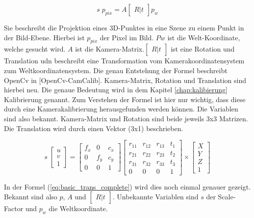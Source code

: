 	\begin{equation}
	s \; p_{pix} = A \begin{bmatrix} R|t \end{bmatrix} p_w
	\label{eq:basic_trans}
	\end{equation}
	
	Sie beschreibt die Projektion eines 3D-Punktes in eine Szene zu einem Punkt in der Bild-Ebene. Hierbei ist \( p_{pix} \) der Pixel im Bild. \( Pw \) ist die Welt-Koordinate, welche gesucht wird. \( A \) ist die Kamera-Matrix.\( \begin{bmatrix} R|t \end{bmatrix} \) ist eine Rotation und Translation udn beschreibt eine Transformation vom Kamerakoordinatensystem zum Weltkoordinatensystem. Die genau Entstehung der Formel beschreibt OpenCv in [OpenCv-CamCalib]. Kamera-Matrix, Rotation und Translation sind hierbei neu. Die genaue Bedeutung wird in dem Kapitel \ref{chap:kalibierung} Kalibrierung genannt. Zum Verstehen der Formel ist hier nur wichtig, dass diese durch eine Kamerakalibrierung herausgefunden werden können. Die Variablen sind also bekannt. Kamera-Matrix und Rotation sind beide jeweils 3x3 Matrizen. Die Translation wird durch einen Vektor (3x1) beschrieben. 
	
	\begin{equation}
	s \; \begin{bmatrix}
	u \\ 
	v \\ 
	1
	\end{bmatrix} = \begin{bmatrix}
	f_x & 0 & c_x \\
	0 & f_y & c_y \\
	0 & 0 & 1
	\end{bmatrix} \begin{bmatrix}
	r_{11} & r_{12} & r_{13} & t_1 \\ 
	r_{21} & r_{22} & r_{23} & t_2 \\ 
	r_{31} & r_{32} & r_{33} & t_3 \\
	0 & 0 & 0 & 1
	\end{bmatrix} \times \begin{bmatrix}
	X \\ 
	Y \\ 
	Z \\
	1
	\end{bmatrix}
	\label{eq:basic_trans_complete}
	\end{equation}
	
	In der Formel (\ref{eq:basic_trans_complete}) wird dies noch einmal genauer gezeigt. Bekannt sind also \( p \), \( A \) und \( \begin{bmatrix} R|t \end{bmatrix} \). Unbekannte Variablen sind \( s \) der Scale-Factor und \( p_w \) die Weltkoordinate.
	
